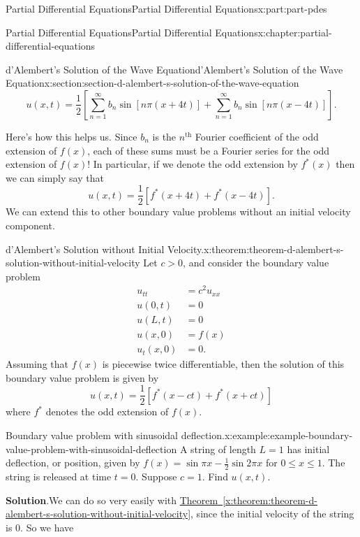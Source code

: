 \documentclass[twoside,10pt,]{book}
\newcommand{\blocktitlefont}{\relax}
\newcommand{\xreffont}{\relax}
\numberwithin{equation}{part}
\renewcommand{\th}{\text{th}}
\newcommand{\gt}{>}
\newcommand{\amp}{&}
\begin{document}
\begin{partptx}{Partial Differential Equations}{}{Partial Differential Equations}{}{}{x:part:part-pdes}
\begin{chapterptx}{Partial Differential Equations}{}{Partial Differential Equations}{}{}{x:chapter:partial-differential-equations}
\begin{sectionptx}{d'Alembert's Solution of the Wave Equation}{}{d'Alembert's Solution of the Wave Equation}{}{}{x:section:section-d-alembert-s-solution-of-the-wave-equation}
\begin{equation*}
u(x,t) = \frac{1}{2}\left[\sum_{n=1}^{\infty}b_{n}\sin[n\pi(x+4t)] + \sum_{n=1}^{\infty}b_{n}\sin[n\pi(x-4t)]\right].
\end{equation*}
%
\par
Here's how this helps us. Since \(b_{n}\) is the \(n^{\th}\) Fourier coefficient of the odd extension of \(f(x)\), each of these sums must be a Fourier series for the odd extension of \(f(x)\)! In particular, if we denote the odd extension by \(f^{*}(x)\) then we can simply say that%
%
\begin{equation*}
u(x,t) = \frac{1}{2}[f^{*}(x+4t)+f^{*}(x-4t)].
\end{equation*}
We can extend this to other boundary value problems without an initial velocity component.%
\begin{theorem}{d'Alembert's Solution without Initial Velocity.}{}{x:theorem:theorem-d-alembert-s-solution-without-initial-velocity}%
%
Let \(c\gt0\), and consider the boundary value problem%
%
\begin{align*}
u_{tt} \amp = c^{2}u_{xx} \\
u(0,t) \amp = 0 \\
u(L,t) \amp = 0 \\
u(x,0) \amp = f(x) \\
u_{t}(x,0) \amp = 0 \text{.}
\end{align*}
Assuming that \(f(x)\) is piecewise twice differentiable, then the solution of this boundary value problem is given by%
\begin{equation*}
u(x,t) = \frac{1}{2}[f^{*}(x-ct)+f^{*}(x+ct)]
\end{equation*}
where \(f^{*}\) denotes the odd extension of \(f(x)\).%
\end{theorem}
\begin{example}{Boundary value problem with sinusoidal deflection.}{x:example:example-boundary-value-problem-with-sinusoidal-deflection}%
A string of length \(L=1\) has initial deflection, or position, given by \(f(x) = \sin\pi x - \frac{1}{2}\sin2\pi x\) for \(0\leq x\leq 1\). The string is released at time \(t=0\). Suppose \(c=1\). Find \(u(x,t)\).%
\par\smallskip%
\noindent\textbf{\blocktitlefont Solution}.\hypertarget{g:solution:idp105548818191264}{}\quad{}We can do so very easily with \hyperref[x:theorem:theorem-d-alembert-s-solution-without-initial-velocity]{Theorem~{\xreffont\ref{x:theorem:theorem-d-alembert-s-solution-without-initial-velocity}}}, since the initial velocity of the string is \(0\). So we have%

\end{example}
\end{sectionptx}
\end{chapterptx}
\end{partptx}
\end{document}
